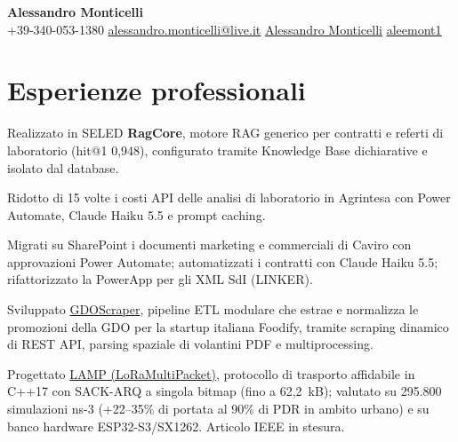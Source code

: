\documentclass[a4paper,11pt,italian]{article}
\begin{document}
\setlength{\footskip}{5pt}
\begin{center}
  \textbf{\Large Alessandro Monticelli} \\ \vspace{3pt}
  {\small{} +39-340-053-1380 \quad
    \href{mailto:alessandro.monticelli@live.it}{{} \underline{alessandro.monticelli@live.it}} \quad
    \href{https://www.linkedin.com/in/ale-mont}{{} \underline{Alessandro Monticelli}} \quad
    \href{https://github.com/aleemont1}{{} \underline{aleemont1}}}
\end{center}
\vspace{-6pt}

\section{Esperienze professionali}
\resumeSubHeadingListStart
    \resumeItemListStart
        \item\small{Realizzato in SELED \textbf{RagCore}, motore RAG generico per contratti e referti di laboratorio (hit@1 0,948), configurato tramite Knowledge Base dichiarative e isolato dal database.}
        \item\small{Ridotto di 15 volte i costi API delle analisi di laboratorio in Agrintesa con Power Automate, Claude Haiku 5.5 e prompt caching.}
        \item\small{Migrati su SharePoint i documenti marketing e commerciali di Caviro con approvazioni Power Automate; automatizzati i contratti con Claude Haiku 5.5; rifattorizzato la PowerApp per gli XML SdI (LINKER).}
    \resumeItemListEnd

    \resumeItemListStart
        \item\small{Sviluppato \href{https://github.com/aleemont1/supermarket-scraper}{GDOScraper}, pipeline ETL modulare che estrae e normalizza le promozioni della GDO per la startup italiana Foodify, tramite scraping dinamico di REST API, parsing spaziale di volantini PDF e multiprocessing.}
    \resumeItemListEnd

    \resumeItemListStart
        \item\small{Progettato \href{https://github.com/aleemont1/LAMP}{LAMP (LoRaMultiPacket)}, protocollo di trasporto affidabile in C++17 con SACK-ARQ a singola bitmap (fino a 62,2~kB); valutato su 295.800 simulazioni ns-3 (+22--35\% di portata al 90\% di PDR in ambito urbano) e su banco hardware ESP32-S3/SX1262. Articolo IEEE in stesura.}
    \resumeItemListEnd
\end{document}
